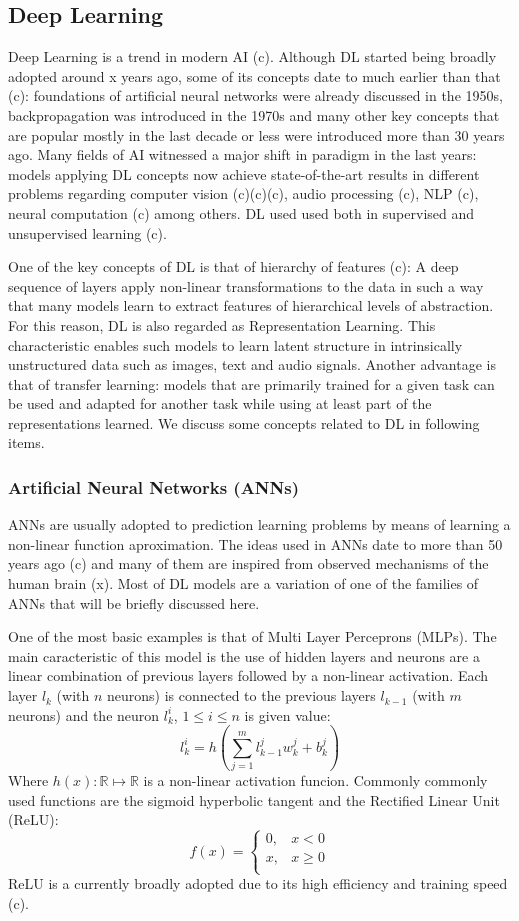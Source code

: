 \documentclass[article]{IEEEtran}
\begin{document}
\subsection{Deep Learning}
Deep Learning is a trend in modern AI (c).
Although DL started being broadly adopted around x years ago,
some of its concepts date to much earlier than that (c):
foundations of artificial neural networks were already discussed
in the 1950s, backpropagation was introduced in the 1970s
and many other key concepts that are popular mostly in the last decade or less
were introduced more than 30 years ago.
Many fields of AI witnessed a major shift in paradigm
in the last years: models applying DL concepts now achieve state-of-the-art
results in different problems regarding computer vision (c)(c)(c),
audio processing (c), NLP (c), neural computation (c) among others.
DL used used both in supervised and unsupervised learning (c).

One of the key concepts of DL is that of hierarchy of features (c):
A deep sequence of layers apply non-linear transformations to the data
in such a way that many models learn to extract features of hierarchical
levels of abstraction.
For this reason, DL is also regarded as Representation Learning.
This characteristic enables such models to learn latent structure
in intrinsically unstructured data such as images, text and audio signals.
Another advantage is that of transfer learning: models that are
primarily trained for a given task can be used and adapted for another
task while using at least part of the representations learned.
We discuss some concepts related to DL in following items.

\subsubsection{Artificial Neural Networks (ANNs)}
ANNs are usually adopted to prediction
learning problems by means of learning a non-linear function aproximation.
The ideas used in ANNs date to more than 50 years ago (c) and many of them
are inspired from observed mechanisms of the human brain (x).
Most of DL models are a variation of one of the families of ANNs
that will be briefly discussed here.

One of the most basic examples is that of Multi Layer Perceprons (MLPs).
The main caracteristic of this model is the use of hidden layers
and neurons are a linear combination of previous layers followed by
a non-linear activation.
Each layer $l_k$ (with $n$ neurons) is connected to the previous layers
$l_{k-1}$ (with $m$ neurons) and the neuron $l_k^i$, $1 \le i \le n$
is given value:
$$l_k^i = h\left(\sum_{j=1}^{m} l_{k-1}^jw_k^j + b_k^j\right)$$
Where $h(x): \mathbb{R} \mapsto \mathbb{R}$ is a non-linear activation funcion.
Commonly commonly used functions are the sigmoid hyperbolic tangent
and the Rectified Linear Unit (ReLU):
$$f(x) = \begin{cases}
    0, & x < 0 \\
    x, & x \ge 0 \\
        \end{cases}
$$
ReLU is a currently broadly adopted due to its high efficiency
and training speed (c).
\end{document}
